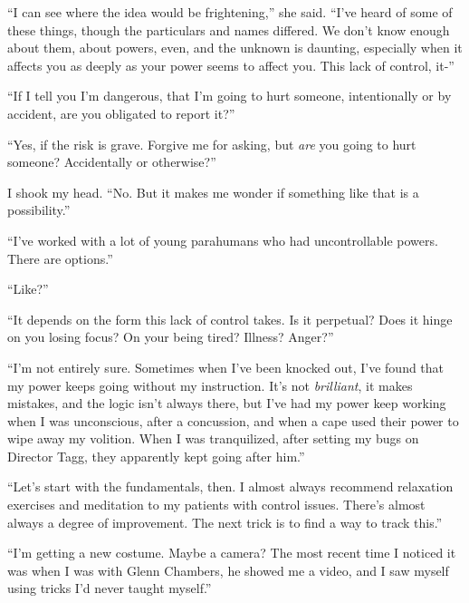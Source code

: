 ``I can see where the idea would be frightening,'' she said.  ``I've heard of some of these things, though the particulars and names differed.  We don't know enough about them, about powers, even, and the unknown is daunting, especially when it affects you as deeply as your power seems to affect you.  This lack of control, it-''



``If I tell you I'm dangerous, that I'm going to hurt someone, intentionally or by accident, are you obligated to report it?''



``Yes, if the risk is grave.  Forgive me for asking, but \emph{are} you going to hurt someone?  Accidentally or otherwise?''



I shook my head.  ``No.  But it makes me wonder if something like that is a possibility.''



``I've worked with a lot of young parahumans who had uncontrollable powers.  There are options.''



``Like?''



``It depends on the form this lack of control takes.  Is it perpetual?  Does it hinge on you losing focus?  On your being tired?  Illness?  Anger?''



``I'm not entirely sure.  Sometimes when I've been knocked out, I've found that my power keeps going without my instruction.  It's not \emph{brilliant}, it makes mistakes, and the logic isn't always there, but I've had my power keep working when I was unconscious, after a concussion, and when a cape used their power to wipe away my volition.  When I was tranquilized, after setting my bugs on Director Tagg, they apparently kept going after him.''



``Let's start with the fundamentals, then.  I almost always recommend relaxation exercises and meditation to my patients with control issues.  There's almost always a degree of improvement.  The next trick is to find a way to track this.''



``I'm getting a new costume.  Maybe a camera?  The most recent time I noticed it was when I was with Glenn Chambers, he showed me a video, and I saw myself using tricks I'd never taught myself.''



